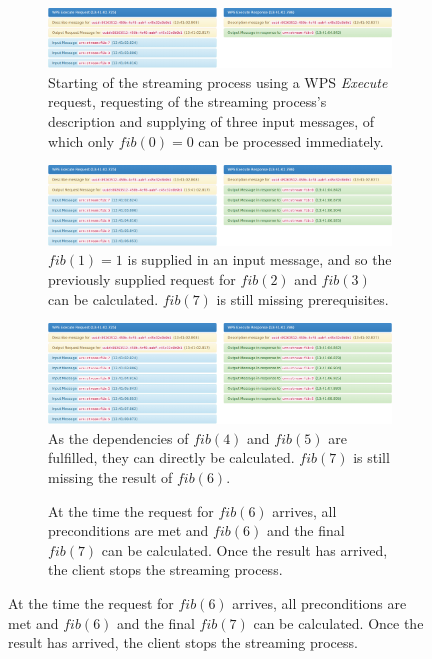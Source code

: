    \begin{figure}
      \def\fibfigsize{1\linewidth}
      \centering
      \begin{subfigure}{\fibfigsize}
        \caption{Starting of the streaming process using a WPS \emph{Execute} request, requesting of the streaming process's description and supplying of three input messages, of which only $fib(0) = 0$ can be processed immediately.}
        \includegraphics[width = \linewidth]{figures/fibonacci-1.png}
      \end{subfigure}
      \begin{subfigure}{\fibfigsize}
        \caption{$fib(1) = 1$ is supplied in an input message, and so the previously supplied request for $fib(2)$ and $fib(3)$ can be calculated. $fib(7)$ is still missing prerequisites.}
        \includegraphics[width = \linewidth]{figures/fibonacci-2.png}
      \end{subfigure}
      \begin{subfigure}{\fibfigsize}
        \caption{As the dependencies of $fib(4)$ and $fib(5)$ are fulfilled, they can directly be calculated. $fib(7)$ is still missing the result of $fib(6)$.}
        \includegraphics[width = \linewidth]{figures/fibonacci-3.png}
      \end{subfigure}
      \begin{subfigure}{\fibfigsize}
        \caption{At the time the request for $fib(6)$ arrives, all preconditions are met and $fib(6)$ and the final $fib(7)$ can be calculated. Once the result has arrived, the client stops the streaming process.}

\end{subfigure}
\end{figure}
